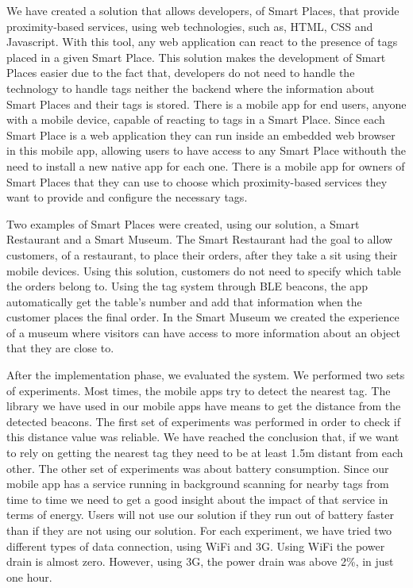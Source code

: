 We have created a solution that allows developers, of Smart Places, that provide proximity-based services, using web technologies, such as, \gls{HTML}, \gls{CSS} and Javascript.
With this tool, any web application can react to the presence of tags placed in a given Smart Place.
This solution makes the development of Smart Places easier due to the fact that, developers do not need to handle the technology to handle tags neither the backend where the information about Smart Places and their tags is stored.
There is a mobile app for end users, anyone with a mobile device, capable of reacting to tags in a Smart Place.
Since each Smart Place is a web application they can run inside an embedded web browser in this mobile app, allowing users to have access to any Smart Place withouth the need to install a new native app for each one.
There is a mobile app for owners of Smart Places that they can use to choose which proximity-based services they want to provide and configure the necessary tags.

Two examples of Smart Places were created, using our solution, a Smart Restaurant and a Smart Museum.
The Smart Restaurant had the goal to allow customers, of a restaurant, to place their orders, after they take a sit using their mobile devices.
Using this solution, customers do not need to specify which table the orders belong to. Using the tag system through \gls{BLE} beacons, the app automatically get the table's number and add that information when the customer places the final order.
In the Smart Museum we created the experience of a museum where visitors can have access to more information about an object that they are close to.

After the implementation phase, we evaluated the system.
We performed two sets of experiments.
Most times, the mobile apps try to detect the nearest tag.
The library we have used in our mobile apps have means to get the distance from the detected beacons.
The first set of experiments was performed in order to check if this distance value was reliable.
We have reached the conclusion that, if we want to rely on getting the nearest tag they need to be at least 1.5m distant from each other.
The other set of experiments was about battery consumption.
Since our mobile app has a service running in background scanning for nearby tags from time to time we need to get a good insight about the impact of that service in terms of energy.
Users will not use our solution if they run out of battery faster than if they are not using our solution.
For each experiment, we have tried two different types of data connection, using \gls{WiFi} and \gls{3G}.
Using \gls{WiFi} the power drain is almost zero.
However, using \gls{3G}, the power drain was above 2\%, in just one hour.

